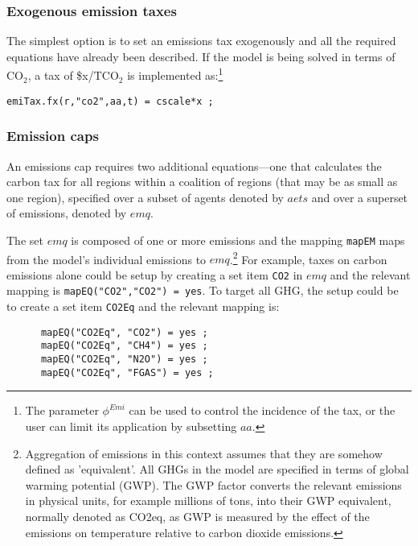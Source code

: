 \documentclass[11pt,letterpaper]{report}
\begin{document}
\subsubsection{Exogenous emission taxes}
The simplest option is to set an emissions tax exogenously and all the required
equations have already been described. If the model is
being solved in terms of $\textrm{CO}_2$, a tax of \$x/$\textrm{TCO}_2$ is
implemented as:\footnote{The parameter $\phi^{\mathit{Emi}}$ can be used
to control the incidence of the tax, or the user can limit its application
by subsetting $\mathit{aa}$.}

\medskip
\texttt{emiTax.fx(r,"co2",aa,t) = cscale*x ;}
\medskip

\subsubsection{Emission caps}

An emissions cap requires two additional equations---one that calculates the
carbon tax for all regions within a coalition of regions (that may be as small
as one region), specified over a subset of agents denoted by $\mathit{aets}$
and over a superset of emissions, denoted by $\mathit{emq}$.

The set $\mathit{emq}$ is composed of one or more emissions and the mapping
\texttt{mapEM} maps from the model's individual emissions to
$\mathit{emq}$.\footnote{Aggregation of emissions in this context
assumes that they are somehow defined as 'equivalent'. All GHGs
in the model are specified in terms of global warming potential (GWP).
The GWP factor converts the relevant emissions in physical units,
for example millions of tons, into their GWP equivalent, normally
denoted as CO2eq, as GWP is measured by the effect
of the emissions on temperature relative to carbon dioxide emissions.}
For example, taxes on carbon emissions alone could be setup by
creating a set item \texttt{CO2} in $\mathit{emq}$ and the relevant
mapping is \texttt{mapEQ("CO2","CO2") = yes}. To target all GHG, the
setup could be to create a set item \texttt{CO2Eq} and
the relevant mapping is:

\begin{verbatim}
      mapEQ("CO2Eq", "CO2") = yes ;
      mapEQ("CO2Eq", "CH4") = yes ;
      mapEQ("CO2Eq", "N2O") = yes ;
      mapEQ("CO2Eq", "FGAS") = yes ;
\end{verbatim}
\end{document}
